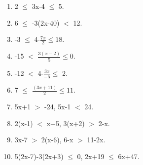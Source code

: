 \begin{enumerate}[label=\arabic*.,ref=\thesubsection.\theenumi]
 
    \item 2 $\leq$ 3x-4 $\leq$ 5.
    \item 6 $\leq$ -3(2x-40)  $<$ 12.
    \item -3 $\leq$ 4-$\frac{7x}{2} \leq 18$. 
    \item -15 $<$ $\frac{3(x-2)}{5} \leq 0$.
    \item -12 $<$ 4-$\frac{3x}{-5} \leq$ 2.
    \item 7 $\leq$ $\frac{(3x+11)}{2} \leq 11$.
    
    \item 5x+1 $>$ -24, 5x-1 $<$ 24.
    \item 2(x-1) $<$ x+5, 3(x+2) $>$ 2-x.
    \item 3x-7 $>$ 2(x-6), 6-x $>$ 11-2x.
    \item 5(2x-7)-3(2x+3) $\leq$ 0, 2x+19 $\leq$ 6x+47.
 \end{enumerate}
    
